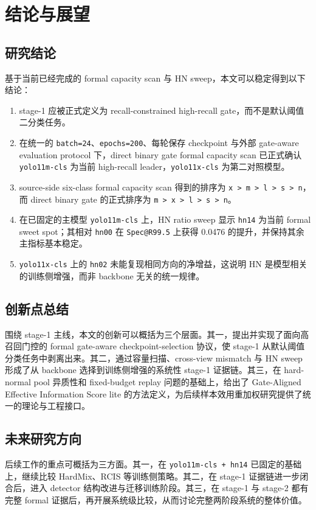 \documentclass[UTF8,openany,12pt]{ctexbook}
\newcommand{\formalmetric}[1]{\texttt{#1}}
\begin{document}
\chapter{结论与展望}

\section{研究结论}
基于当前已经完成的 formal capacity scan 与 HN sweep，本文可以稳定得到以下结论：
\begin{enumerate}[label=\arabic*.]
    \item stage-1 应被正式定义为 recall-constrained high-recall gate，而不是默认阈值二分类任务。
    \item 在统一的 \texttt{batch=24}、\texttt{epochs=200}、每轮保存 checkpoint 与外部 gate-aware evaluation protocol 下，direct binary gate formal capacity scan 已正式确认 \texttt{yolo11m-cls} 为当前 high-recall leader，\texttt{yolo11x-cls} 为第二对照模型。
    \item source-side six-class formal capacity scan 得到的排序为 \texttt{x > m > l > s > n}，而 direct binary gate 的正式排序为 \texttt{m > x > l > s > n}。
    \item 在已固定的主模型 \texttt{yolo11m-cls} 上，HN ratio sweep 显示 \texttt{hn14} 为当前 formal sweet spot；其相对 \texttt{hn00} 在 \formalmetric{Spec@R99.5} 上获得 0.0476 的提升，并保持其余主指标基本稳定。
    \item \texttt{yolo11x-cls} 上的 \texttt{hn02} 未能复现相同方向的净增益，这说明 HN 是模型相关的训练侧增强，而非 backbone 无关的统一规律。
\end{enumerate}

\section{创新点总结}
围绕 stage-1 主线，本文的创新可以概括为三个层面。其一，提出并实现了面向高召回门控的 formal gate-aware checkpoint-selection 协议，使 stage-1 从默认阈值分类任务中剥离出来。其二，通过容量扫描、cross-view mismatch 与 HN sweep 形成了从 backbone 选择到训练侧增强的系统性 stage-1 证据链。其三，在 hard-normal pool 异质性和 fixed-budget replay 问题的基础上，给出了 Gate-Aligned Effective Information Score lite 的方法定义，为后续样本效用重加权研究提供了统一的理论与工程接口。

\section{未来研究方向}
后续工作的重点可概括为三方面。其一，在 \texttt{yolo11m-cls + hn14} 已固定的基础上，继续比较 HardMix、RCIS 等训练侧策略。其二，在 stage-1 证据链进一步闭合后，进入 detector 结构改进与迁移训练阶段。其三，在 stage-1 与 stage-2 都有完整 formal 证据后，再开展系统级比较，从而讨论完整两阶段系统的整体价值。
\end{document}
